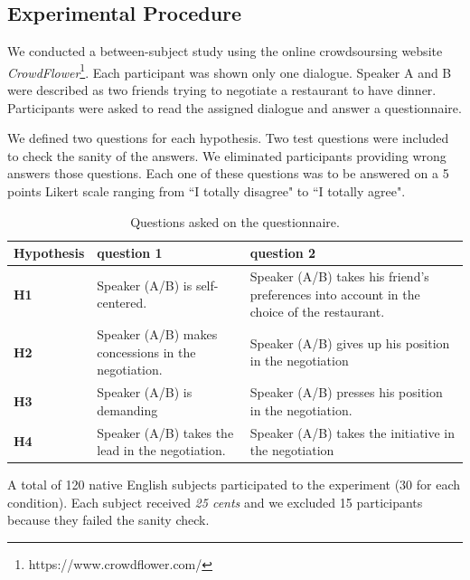 \documentclass{llncs}
\begin{document}
			
			\subsection{Experimental Procedure}
			
			We conducted a between-subject study using the online crowdsoursing website \emph{CrowdFlower}\footnote{https://www.crowdflower.com/}. 
			Each participant was shown only one dialogue. Speaker A and B were described as two friends trying to negotiate a restaurant to have dinner. %
			Participants were asked to read the assigned dialogue and answer a questionnaire. 
			
			We defined two questions for each hypothesis. Two test questions were included to check the	sanity of the answers. We eliminated participants providing wrong answers those questions. Each one of these questions was to be answered on a 5 points Likert scale ranging from ``I totally disagree" to ``I totally agree".
			
			\begin{table}
				{\scriptsize
					\begin{tabular}{|p{1.75cm}|p{5cm}|p{5.5cm}|}
						\hline
						Hypothesis &question 1& question 2 \\
						\hline
						\textbf{H1} &Speaker (A/B) is self-centered. &Speaker (A/B) takes his friend's preferences into account in the choice of the restaurant.\\
						\hline
						\textbf{H2} &Speaker (A/B) makes concessions in the negotiation.&Speaker (A/B) gives up his position in the negotiation\\
						\hline
						\textbf{H3} & Speaker (A/B) is demanding&Speaker (A/B) presses his position in the negotiation. \\
						\hline
						\textbf{H4} &Speaker (A/B) takes the lead in the negotiation.&Speaker (A/B) takes the initiative in the negotiation \\
						\hline
					\end{tabular}
				}
				\caption{Questions asked on the questionnaire.}
				\label{table:questionnaire}
			\end{table}

			A total of 120 native English subjects participated to the experiment (30 for each condition). Each subject received \textit{25 cents} and we excluded 15 participants because they failed the sanity check.
			
\end{document}
